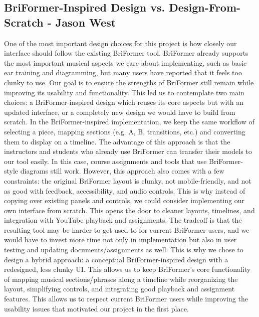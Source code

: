 \documentclass[12pt, letterpaper]{article}
\begin{document}
\subsection*{BriFormer-Inspired Design vs. Design-From-Scratch - Jason West}
One of the most important design choices for this project is how closely our interface should follow the existing BriFormer tool. BriFormer already supports the most important musical aspects we care about implementing, such as basic ear training and diagramming, but many users have reported that it feels too clunky to use. Our goal is to ensure the strengths of BriFormer still remain while improving its usability and functionality. This led us to contemplate two main choices: a BriFormer-inspired design which reuses its core aspects but with an updated interface, or a completely new design we would have to build from scratch. In the BriFormer-inspired implementation, we keep the same workflow of selecting a piece, mapping sections (e.g. A, B, transitions, etc.) and converting them to display on a timeline. The advantage of this approach is that the instructors and students who already use BriFormer can transfer their models to our tool easily. In this case, course assignments and tools that use BriFormer-style diagrams still work. However, this approach also comes with a few constraints: the original BriFormer layout is clunky, not mobile-friendly, and not as good with feedback, accessibility, and audio controls. This is why instead of copying over existing panels and controls, we could consider implementing our own interface from scratch. This opens the door to cleaner layouts, timelines, and integration with YouTube playback and assignments. The tradeoff is that the resulting tool may be harder to get used to for current BriFormer users, and we would have to invest more time not only in implementation but also in user testing and updating documents/assignments as well. This is why we chose to design a hybrid approach: a conceptual BriFormer-inspired design with a redesigned, less clunky UI. This allows us to keep BriFormer's core functionality of mapping musical sections/phrases along a timeline while reorganizing the layout, simplifying controls, and integrating good playback and assignment features. This allows us to respect current BriFormer users while improving the usability issues that motivated our project in the first place.
\end{document}
